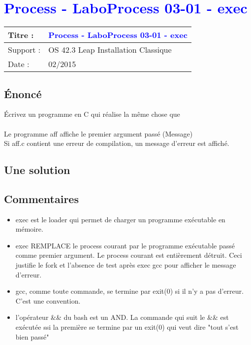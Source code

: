 \lstset{language=c}
\renewcommand{\titre}{\textcolor{blue}{ Process - LaboProcess 03-01 - exec }}

\lhead{ \titre }
\section{{\titre} }

\begin{tabular}{|l|l|}
\hline
Titre : 	& \titre \\\hline
Support : 	& OS 42.3 Leap Installation Classique \\\hline
Date :		& 02/2015 \\\hline
\end{tabular}

\subsection{Énoncé}

Écrivez un programme en C qui réalise la même chose que \\
\\
Le programme aff affiche le premier argument passé (Message)\\
Si aff.c contient une erreur de compilation, un message d'erreur est affiché. 

\subsection{Une solution}




\subsection{Commentaires}

\begin{itemize}
\item exec est le loader qui permet de charger un programme exécutable en mémoire.
\item exec REMPLACE le process courant par le programme exécutable passé comme premier argument. Le process courant est entièrement détruit. Ceci justifie le fork et l'absence de test après exec gcc pour afficher le message d'erreur.
\item gcc, comme toute commande, se termine par exit(0) si il n'y a pas d'erreur. C'est une convention.
\item l'opérateur \&\& du bash est un AND. La commande qui suit le \&\& est exécutée ssi la première se termine par un exit(0) qui veut dire "tout s'est bien passé"
\end{itemize}
\newpage
